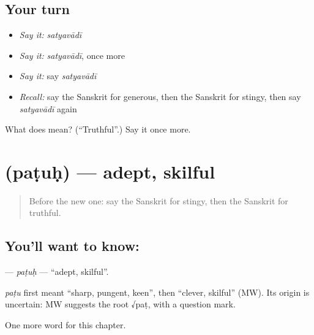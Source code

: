 \subsection*{Your turn}
\begin{itemize}
\raggedright
  \item \emph{Say it:} \emph{satyavādī}
  \item \emph{Say it:} \emph{satyavādī}, once more
  \item \emph{Say it:} say \emph{satyavādī}
  \item \emph{Recall:} say the Sanskrit for generous, then the Sanskrit for stingy, then say \emph{satyavādī} again
\end{itemize}

\begin{tcolorbox}[breakable,colback=teal!4,colframe=teal!35!black,title={Before you move on}]
What does  mean? (\textquotedblleft{}Truthful\textquotedblright{}.) Say it once more.
\end{tcolorbox}
\section[\texorpdfstring{\sk{पटुः} (paṭuḥ)}{पटुः (paṭuḥ)}]{ (paṭuḥ) — adept, skilful}

\label{lesson:SA-C187-patuh}



\begin{quote}
Before the new one: say the Sanskrit for stingy, then the Sanskrit for truthful.
\end{quote}

\subsection*{You'll want to know: }
\textbf{} — \emph{paṭuḥ} — \textquotedblleft{}adept, skilful\textquotedblright{}.

\begin{cousinweb}
\emph{paṭu} first meant \textquotedblleft{}sharp, pungent, keen\textquotedblright{}, then \textquotedblleft{}clever, skilful\textquotedblright{} (MW). Its origin is uncertain: MW suggests the root √paṭ, with a question mark.
\end{cousinweb}

\begin{grammarlens}[title={What you've built}]
One more word for this chapter.
\end{grammarlens}

